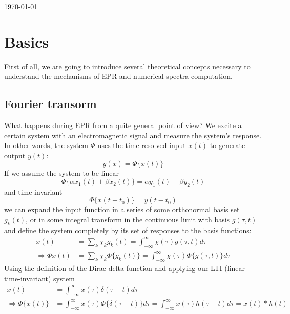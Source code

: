 \documentclass[11.5pt,a4paper]{article}
\begin{document}
\newpage
\tableofcontents

\vfill
\hfill \today 


\newpage

\section{Basics}
First of all, we are going to introduce several theoretical concepts necessary to understand the mechanisms of EPR and numerical spectra computation.

\subsection{Fourier transorm}
What happens during EPR from a quite general point of view? We excite a certain system with an electromagnetic signal and measure the system's response. In other words, the system $\Phi$ uses the time-resolved input $x(t)$ to generate output $y(t)$:
\begin{equation}
	y(x) = \Phi\{x(t)\}
\end{equation}
If we assume the system to be linear
\begin{equation}
 	\Phi\{\alpha x_1(t) + \beta x_2(t)\} = \alpha y_1(t) + \beta y_2(t)
\end{equation}
and time-invariant
\begin{equation}
	\Phi\{x(t-t_0)\} = y(t-t_0)
\end{equation}
we can expand the input function in a series of some orthonormal basis set $g_k(t)$, or in some integral transform in the continuous limit with basis $g(\tau,t)$ and define the system completely by its set of responses to the basis functions:
\begin{align}
	x(t) & = \sum_k \chi_k g_k(t) = \int_{-\infty}^{\infty} \chi(\tau) g(\tau,t) d\tau \\
	\Rightarrow \Phi{x(t)} & = \sum_k \chi_k \Phi\{g_k(t)\} = \int_{-\infty}^{\infty} \chi(\tau) \Phi\{g(\tau,t)\} d\tau
\end{align}
Using the definition of the Dirac delta function and applying our LTI (linear time-invariant) system
\begin{align}
	x(t) & =  \int_{-\infty}^{\infty} x(\tau) \delta(\tau-t) d\tau \\
	\Rightarrow 	\Phi\{x(t)\} & =  \int_{-\infty}^{\infty} x(\tau) \Phi\{\delta(\tau-t)\} d\tau = \int_{-\infty}^{\infty} x(\tau) h(\tau-t) d\tau = x(t) * h(t)
\end{align}
\end{document}
